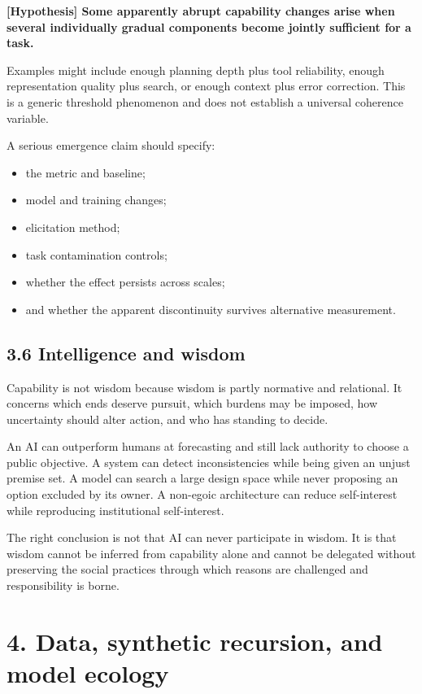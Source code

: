 \documentclass[
  11pt,
]{article}
\providecommand{\tightlist}{%
  \setlength{\itemsep}{0pt}\setlength{\parskip}{0pt}}
\begin{document}
\textbf{{[}Hypothesis{]} Some apparently abrupt capability changes arise
when several individually gradual components become jointly sufficient
for a task.}

Examples might include enough planning depth plus tool reliability,
enough representation quality plus search, or enough context plus error
correction. This is a generic threshold phenomenon and does not
establish a universal coherence variable.

A serious emergence claim should specify:

\begin{itemize}
\tightlist
\item
  the metric and baseline;
\item
  model and training changes;
\item
  elicitation method;
\item
  task contamination controls;
\item
  whether the effect persists across scales;
\item
  and whether the apparent discontinuity survives alternative
  measurement.
\end{itemize}

\subsection{3.6 Intelligence and wisdom}\label{intelligence-and-wisdom}

Capability is not wisdom because wisdom is partly normative and
relational. It concerns which ends deserve pursuit, which burdens may be
imposed, how uncertainty should alter action, and who has standing to
decide.

An AI can outperform humans at forecasting and still lack authority to
choose a public objective. A system can detect inconsistencies while
being given an unjust premise set. A model can search a large design
space while never proposing an option excluded by its owner. A non-egoic
architecture can reduce self-interest while reproducing institutional
self-interest.

The right conclusion is not that AI can never participate in wisdom. It
is that wisdom cannot be inferred from capability alone and cannot be
delegated without preserving the social practices through which reasons
are challenged and responsibility is borne.

\section{4. Data, synthetic recursion, and model
ecology}\label{data-synthetic-recursion-and-model-ecology}
\end{document}
